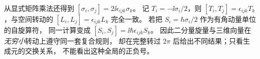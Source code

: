 从显式矩阵乘法还得到
\([\sigma_i,\sigma_j]=2\ii\epsilon_{ijk}\sigma_k\)。
记 \(T_i=-\ii\sigma_i/2\)，则
\([T_i,T_j]=\epsilon_{ijk}T_k\)，与空间转动的
\([L_i,L_j]=\epsilon_{ijk}L_k\) 完全一致。
若把 \(S_i=\hbar\sigma_i/2\) 作为有角动量单位的自旋算符，
同一计算变成 \([S_i,S_j]=\ii\hbar\epsilon_{ijk}S_k\)。
因此二分量旋量与三维向量在\emph{无穷小}转动上遵守同一套复合规则，
却在完整转过 \(2\pi\) 后给出不同结果；只看生成元的交换关系，
不能看出这种全局的正负号。



